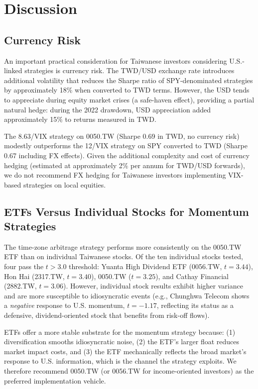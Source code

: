 
\section{Discussion}
\label{sec:discussion}

\subsection{Currency Risk}

An important practical consideration for Taiwanese investors considering U.S.-linked strategies is currency risk. The TWD/USD exchange rate introduces additional volatility that reduces the Sharpe ratio of SPY-denominated strategies by approximately 18\% when converted to TWD terms. However, the USD tends to appreciate during equity market crises (a safe-haven effect), providing a partial natural hedge: during the 2022 drawdown, USD appreciation added approximately 15\% to returns measured in TWD.

The 8.63/VIX strategy on 0050.TW (Sharpe 0.69 in TWD, no currency risk) modestly outperforms the 12/VIX strategy on SPY converted to TWD (Sharpe 0.67 including FX effects). Given the additional complexity and cost of currency hedging (estimated at approximately 2\% per annum for TWD/USD forwards), we do not recommend FX hedging for Taiwanese investors implementing VIX-based strategies on local equities.

\subsection{ETFs Versus Individual Stocks for Momentum Strategies}

The time-zone arbitrage strategy performs more consistently on the 0050.TW ETF than on individual Taiwanese stocks. Of the ten individual stocks tested, four pass the \citet{harvey2016} $t > 3.0$ threshold: Yuanta High Dividend ETF (0056.TW, $t = 3.44$), Hon Hai (2317.TW, $t = 3.40$), 0050.TW ($t = 3.25$), and Cathay Financial (2882.TW, $t = 3.06$). However, individual stock results exhibit higher variance and are more susceptible to idiosyncratic events (e.g., Chunghwa Telecom shows a \textit{negative} response to U.S. momentum, $t = -1.17$, reflecting its status as a defensive, dividend-oriented stock that benefits from risk-off flows).

ETFs offer a more stable substrate for the momentum strategy because: (1) diversification smooths idiosyncratic noise, (2) the ETF's larger float reduces market impact costs, and (3) the ETF mechanically reflects the broad market's response to U.S. information, which is the channel the strategy exploits. We therefore recommend 0050.TW (or 0056.TW for income-oriented investors) as the preferred implementation vehicle.

